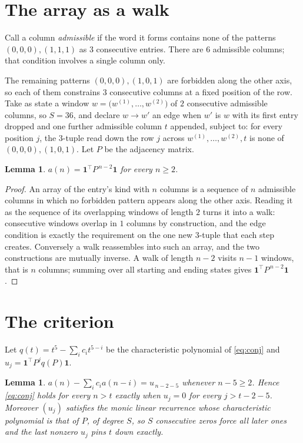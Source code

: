 \documentclass[11pt,a4paper]{article}
\theoremstyle{plain}
\newtheorem{lemma}[theorem]{Lemma}
\theoremstyle{definition}
\begin{document}
\section{The array as a walk}

Call a column \emph{admissible} if the word it forms contains none of the patterns
$(0,0,0), (1,1,1)$ as $3$ consecutive entries. There are $6$ admissible columns; that condition
involves a single column only.

The remaining patterns $(0,0,0), (1,0,1)$ are forbidden along the other axis, so each of them
constrains $3$ consecutive columns at a fixed position of the row. Take as state a
window $w=\bigl(w^{(1)},\dots,w^{(2)}\bigr)$ of $2$ consecutive admissible
columns, so $S=36$, and declare $w\to w'$ an edge when $w'$ is $w$ with its first entry
dropped and one further admissible column $t$ appended, subject to: for every position
$j$, the $3$-tuple read down the row $j$ across $w^{(1)},\dots,w^{(2)},t$
is none of $(0,0,0), (1,0,1)$. Let $P$ be the adjacency matrix.

\begin{lemma}\label{lem:walk}
$a(n)=\mathbf{1}^{\!\top}P^{\,n-2}\mathbf{1}$ for every $n\ge2$.
\end{lemma}

\begin{proof}
An array of the entry's kind with $n$ columns is a sequence of $n$ admissible columns in
which no forbidden pattern appears along the other axis. Reading it as the sequence of its
overlapping windows of length $2$ turns it into a walk: consecutive windows overlap in
$1$ columns by construction, and the edge condition is exactly the requirement on the one
new $3$-tuple that each step creates. Conversely a walk reassembles into such an array,
and the two constructions are mutually inverse. A walk of length $n-2$ visits $n-1$
windows, that is $n$ columns; summing over all starting and ending states gives
$\mathbf{1}^{\!\top}P^{\,n-2}\mathbf{1}$.
\end{proof}

\section{The criterion}

Let $q(t)=t^{5}-\sum_i c_i t^{5-i}$ be the characteristic polynomial of
\eqref{eq:conj} and $u_j=\mathbf{1}^{\!\top}P^{j}q(P)\mathbf{1}$.

\begin{lemma}\label{lem:crit}
$a(n)-\sum_i c_i a(n-i)=u_{\,n-2-5}$ whenever $n-5\ge2$. Hence
\eqref{eq:conj} holds for every $n>t$ exactly when $u_j=0$ for every
$j>t-2-5$. Moreover $(u_j)$ satisfies the monic linear recurrence whose
characteristic polynomial is that of $P$, of degree $S$, so $S$ consecutive zeros force all
later ones and the last nonzero $u_j$ pins $t$ down exactly.
\end{lemma}
\end{document}
